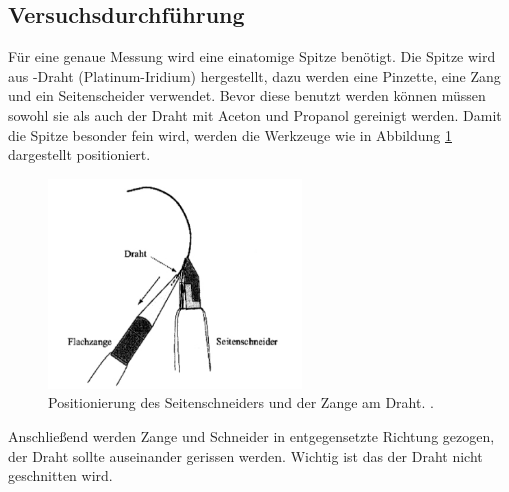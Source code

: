 \subsection{Versuchsdurchführung}

Für eine genaue Messung wird eine einatomige Spitze benötigt.
Die Spitze wird aus -Draht (Platinum-Iridium) hergestellt, dazu
werden eine Pinzette, eine Zang und ein Seitenscheider verwendet.
Bevor diese benutzt werden können müssen sowohl sie als auch der Draht mit Aceton und Propanol
gereinigt werden. Damit die Spitze besonder fein wird, werden die Werkzeuge wie in Abbildung \ref{fig: zange_schneider}
dargestellt positioniert.
\begin{figure}[h]
  \centering
  \includegraphics[width=0.6\textwidth]{./pics/herstellung_spitze.png}
  \caption{Positionierung des Seitenschneiders und der Zange am Draht. \cite{anleitung_frankfurt}.}
  \label{fig: zange_schneider}
\end{figure}

Anschließend werden Zange und Schneider in entgegensetzte Richtung gezogen, der Draht sollte
auseinander gerissen werden. Wichtig ist das der Draht nicht geschnitten wird.

